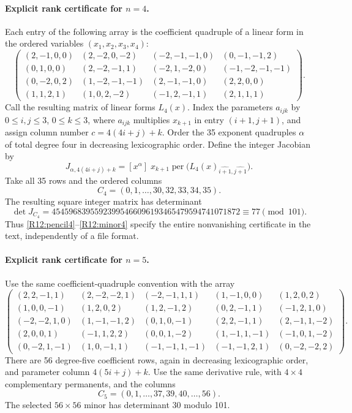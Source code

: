 \paragraph{Explicit rank certificate for $n=4$.}
Each entry of the following array is the coefficient quadruple of
a linear form in the ordered variables $(x_1,x_2,x_3,x_4)$:
\begin{equation}\label{R12:pencil4}
\begin{pmatrix}
(2,-1,0,0)&(2,-2,0,-2)&(-2,-1,-1,0)&(0,-1,-1,2)\\
(0,1,0,0)&(2,-2,-1,1)&(-2,1,-2,0)&(-1,-2,-1,-1)\\
(0,-2,0,2)&(1,-2,-1,-1)&(2,-1,-1,0)&(2,2,0,0)\\
(1,1,2,1)&(1,0,2,-2)&(-1,2,-1,1)&(2,1,1,1)
\end{pmatrix}.
\end{equation}
Call the resulting matrix of linear forms $L_4(x)$. Index the
parameters $a_{ijk}$ by $0\leq i,j\leq3$, $0\leq k\leq3$,
where $a_{ijk}$ multiplies $x_{k+1}$ in entry $(i+1,j+1)$,
and assign column number $c=4(4i+j)+k$.
Order the 35 exponent quadruples $\alpha$ of total degree four in
decreasing lexicographic order. Define the integer Jacobian by
\begin{equation}\label{R12:derivative}
 J_{\alpha,4(4i+j)+k}
 =[x^\alpha]\;x_{k+1}
 \operatorname{per}\bigl(L_4(x)_{\widehat{i+1},\widehat{j+1}}\bigr).
\end{equation}
Take all 35 rows and the ordered columns
\[
 C_4=(0,1,\ldots,30,32,33,34,35).
\]
The resulting square integer matrix has determinant
\begin{equation}\label{R12:minor4}
 \det J_{C_4}
 =45459683955923995466096193465479594741071872
 \equiv77\pmod{101}.
\end{equation}
Thus \eqref{R12:pencil4}--\eqref{R12:minor4} specify the entire
nonvanishing certificate in the text, independently of a file format.

\paragraph{Explicit rank certificate for $n=5$.}
Use the same coefficient-quadruple convention with the array
\begin{equation}\label{R12:pencil5}
\begin{pmatrix}
(2,2,-1,1)&(2,-2,-2,1)&(-2,-1,1,1)&(1,-1,0,0)&(1,2,0,2)\\
(1,0,0,-1)&(1,2,0,2)&(1,2,-1,2)&(0,2,-1,1)&(-1,2,1,0)\\
(-2,-2,1,0)&(1,-1,-1,2)&(0,1,0,-1)&(2,2,-1,1)&(2,-1,1,-2)\\
(2,0,0,1)&(-1,1,2,2)&(0,0,1,-2)&(1,-1,1,-1)&(-1,0,1,-2)\\
(0,-2,1,-1)&(1,0,-1,1)&(-1,-1,1,-1)&(-1,-1,2,1)&(0,-2,-2,2)
\end{pmatrix}.
\end{equation}
There are 56 degree-five coefficient rows, again in decreasing
lexicographic order, and parameter column $4(5i+j)+k$.
Use the same derivative rule, with $4\times4$ complementary
permanents, and the columns
\[
 C_5=(0,1,\ldots,37,39,40,\ldots,56).
\]
The selected $56\times56$ minor has determinant $30$ modulo 101.

